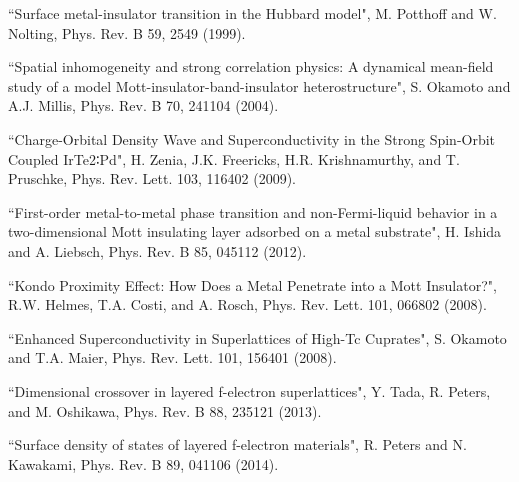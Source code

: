 \documentclass[pra,letterpaper,10pt,twocolumn]{revtex4}
\begin{document}
\begin{thebibliography}{100}
``Surface metal-insulator transition in the Hubbard model",
M. Potthoff and W. Nolting,
Phys. Rev. B 59, 2549 (1999).

``Spatial inhomogeneity and strong correlation physics: A dynamical mean-field study of a model Mott-insulator-band-insulator heterostructure",
S. Okamoto and A.J. Millis,
Phys. Rev. B 70, 241104 (2004).

``Charge-Orbital Density Wave and Superconductivity in the Strong Spin-Orbit Coupled IrTe2∶Pd",
H. Zenia, J.K. Freericks, H.R. Krishnamurthy, and
T. Pruschke,
Phys. Rev. Lett. 103, 116402 (2009).

``First-order metal-to-metal phase transition and non-Fermi-liquid
behavior in a two-dimensional Mott insulating layer adsorbed on a metal
substrate",
H. Ishida and A. Liebsch, 
Phys. Rev. B 85, 045112 (2012).

``Kondo Proximity Effect: How Does a Metal Penetrate into a Mott Insulator?",
R.W. Helmes, T.A. Costi, and A. Rosch,
Phys. Rev. Lett. 101, 066802 (2008).

``Enhanced Superconductivity in Superlattices of High-Tc Cuprates",
S. Okamoto and T.A. Maier,
Phys. Rev. Lett. 101, 156401 (2008).

``Dimensional crossover in layered f-electron superlattices",
Y. Tada, R. Peters, and M. Oshikawa,
Phys. Rev. B 88, 235121 (2013).

``Surface density of states of layered f-electron materials",
R. Peters and N. Kawakami,
Phys. Rev. B 89, 041106 (2014).

\end{thebibliography}
\end{document}
